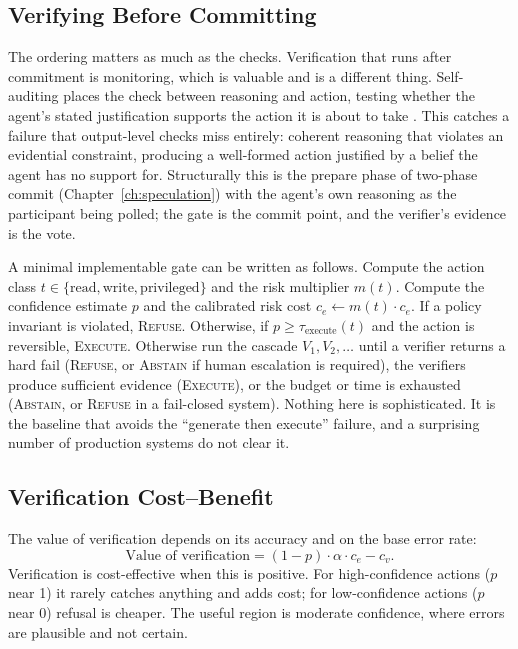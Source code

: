 \documentclass[11pt]{book}
\begin{document}
\subsection{Verifying Before Committing}

The ordering matters as much as the checks. Verification that runs after commitment is monitoring, which is valuable and is a different thing. Self-auditing places the check between reasoning and action, testing whether the agent's stated justification supports the action it is about to take \cite{verifycommit2026}. This catches a failure that output-level checks miss entirely: coherent reasoning that violates an evidential constraint, producing a well-formed action justified by a belief the agent has no support for. Structurally this is the prepare phase of two-phase commit (Chapter~\ref{ch:speculation}) with the agent's own reasoning as the participant being polled; the gate is the commit point, and the verifier's evidence is the vote.

A minimal implementable gate can be written as follows. Compute the action class $t \in \{\text{read}, \text{write}, \text{privileged}\}$ and the risk multiplier $m(t)$. Compute the confidence estimate $p$ and the calibrated risk cost $c_e \leftarrow m(t) \cdot c_e$. If a policy invariant is violated, \textsc{Refuse}. Otherwise, if $p \geq \tau_{\text{execute}}(t)$ and the action is reversible, \textsc{Execute}. Otherwise run the cascade $V_1, V_2, \ldots$ until a verifier returns a hard fail (\textsc{Refuse}, or \textsc{Abstain} if human escalation is required), the verifiers produce sufficient evidence (\textsc{Execute}), or the budget or time is exhausted (\textsc{Abstain}, or \textsc{Refuse} in a fail-closed system). Nothing here is sophisticated. It is the baseline that avoids the ``generate then execute'' failure, and a surprising number of production systems do not clear it.

\subsection{Verification Cost--Benefit}

The value of verification depends on its accuracy and on the base error rate:
\[
\text{Value of verification} = (1-p) \cdot \alpha \cdot c_e - c_v.
\]
Verification is cost-effective when this is positive. For high-confidence actions ($p$ near 1) it rarely catches anything and adds cost; for low-confidence actions ($p$ near 0) refusal is cheaper. The useful region is moderate confidence, where errors are plausible and not certain.
\end{document}
